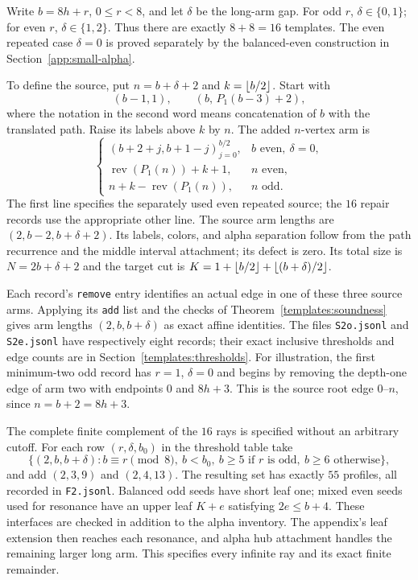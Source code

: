 Write $b=8h+r$, $0\le r<8$, and let $\delta$ be the long-arm gap.
For odd $r$, $\delta\in\{0,1\}$; for even $r$,
$\delta\in\{1,2\}$.  Thus there are exactly $8+8=16$ templates.
The even repeated case $\delta=0$ is proved separately by the
balanced-even construction in Section~\ref{app:small-alpha}.

To define the source, put $n=b+\delta+2$ and $k=\left\lfloor b/2\right\rfloor$.
Start with
\[
 (b-1,1),\qquad (b,\,P_1(b-3)+2),
\]
where the notation in the second word means concatenation of $b$
with the translated path.  Raise its labels above $k$ by $n$.
The added $n$-vertex arm is
\begin{equation}\label{templates:min2-newword}
 \begin{cases}
 (b+2+j,b+1-j)_{j=0}^{b/2},&b\text{ even},\ \delta=0,\\
 \operatorname{rev}(P_1(n))+k+1,&n\text{ even},\\
 n+k-\operatorname{rev}(P_1(n)),&n\text{ odd}.
 \end{cases}
\end{equation}
The first line specifies the separately used even repeated source;
the $16$ repair records use the appropriate other line.  The source
arm lengths are $(2,b-2,b+\delta+2)$.  Its labels, colors, and
alpha separation follow from the path recurrence and the middle
interval attachment; its defect is zero.  Its total size is
$N=2b+\delta+2$ and the target cut is
$K=1+\left\lfloor b/2\right\rfloor+\left\lfloor (b+\delta)/2\right\rfloor$.

Each record's \texttt{remove} entry identifies an actual edge in
one of these three source arms.  Applying its \texttt{add} list and
the checks of Theorem~\ref{templates:soundness} gives arm lengths
$(2,b,b+\delta)$ as exact affine identities.  The files
\texttt{S2o.jsonl} and \texttt{S2e.jsonl} have respectively eight
records; their exact inclusive thresholds and edge counts are in
Section~\ref{templates:thresholds}.  For illustration, the first
minimum-two odd record has $r=1$, $\delta=0$ and begins by removing
the depth-one edge of arm two with endpoints $0$ and $8h+3$.
This is the source root edge $0$--$n$, since $n=b+2=8h+3$.

The complete finite complement of the $16$ rays is specified without
an arbitrary cutoff.  For each row $(r,\delta,b_0)$ in the threshold
table take
\begin{equation}\label{templates:min2-finite}
 \{(2,b,b+\delta):b\equiv r\pmod8,\ b<b_0,\
 b\ge5\text{ if }r\text{ is odd},\ b\ge6\text{ otherwise}\},
\end{equation}
and add $(2,3,9)$ and $(2,4,13)$.  The resulting set has exactly
$55$ profiles, all recorded in \texttt{F2.jsonl}.  Balanced odd
seeds have short leaf one; mixed even seeds used for resonance have
an upper leaf $K+e$ satisfying $2e\le b+4$.  These interfaces are
checked in addition to the alpha inventory.  The appendix's leaf
extension then reaches each resonance, and alpha hub attachment
handles the remaining larger long arm.  This specifies every
infinite ray and its exact finite remainder.

